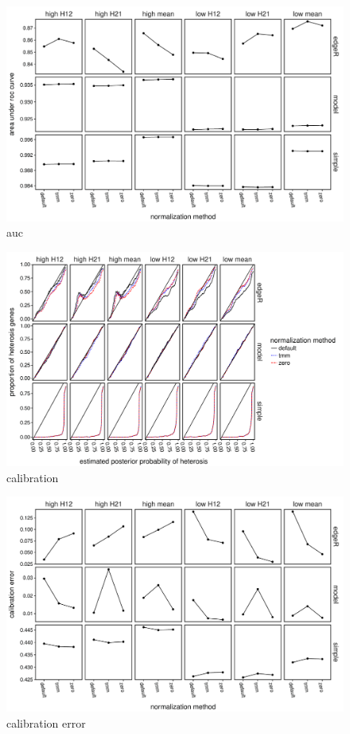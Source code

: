 \documentclass{article}
\begin{document}
\begin{flushleft}
\begin{figure}[htbp]
   \centering
   \includegraphics[scale=0.5]{auc}
   \caption{auc}
   \label{fig:auc}
\end{figure}

\begin{figure}[htbp]
   \centering
   \includegraphics[scale=0.5]{calibration}
   \caption{calibration}
   \label{fig:calibration}
\end{figure}

\begin{figure}[htbp]
   \centering
   \includegraphics[scale=0.5]{calibration_error}
   \caption{calibration error}
   \label{fig:calibrationerror}
\end{figure}

\end{flushleft}
\end{document}
